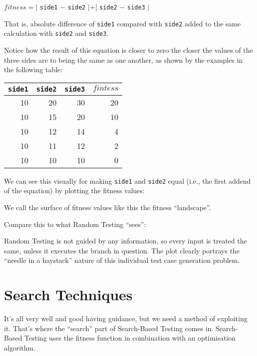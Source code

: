 \begin{center}
$\mathit{fitness} = |$ {\tt side1} $-$ {\tt side2} $| + |$ {\tt side2} $-$ {\tt side3} $|$
\end{center}

That is, absolute difference of {\tt side1} compared with {\tt side2} added to
the same calculation with {\tt side2} and {\tt side3}.

Notice how the result of this equation is closer to zero the closer the values
of the three sides are to being the same as one another, as shown by the
examples in the following table:

\begin{center}
    \begin{tabular}{rrrr}
        \toprule 
        {\tt side1} & {\tt side2} & {\tt side3} & $\mathit{fintess}$ \\
        \midrule
        10 & 20 & 30 & 20 \\
        10 & 15 & 20 & 10 \\
        10 & 12 & 14 & 4  \\
        10 & 11 & 12 & 2  \\
        10 & 10 & 10 & 0  \\
        \bottomrule
    \end{tabular}
\end{center}

We can see this visually for making {\tt side1} and {\tt side2} equal (i.e., the
first addend of the equation) by plotting the fitness values:

We call the surface of fitness values like this the fitness ``landscape''. 

Compare this to what Random Testing ``sees'':

Random Testing is not guided by any information, so every input is treated the
same, unless it executes the branch in question. The plot clearly portrays the 
``needle in a haystack'' nature of this individual test case generation problem.

\section{Search Techniques}

It's all very well and good having guidance, but we need a method of exploiting
it. That's where the ``search'' part of Search-Based Testing comes in.
Search-Based Testing uses the fitness function in combination with an
optimisation algorithm. 

